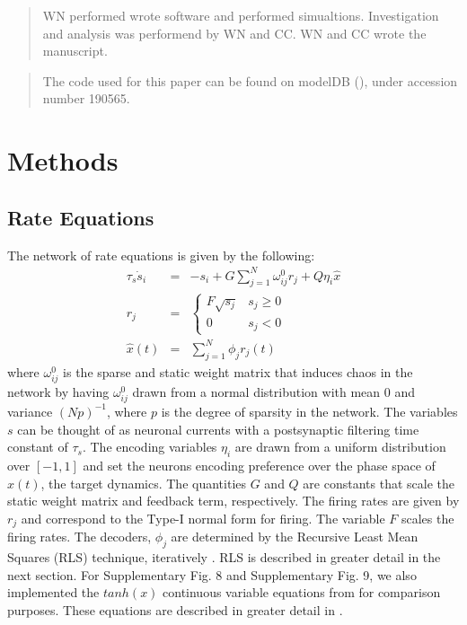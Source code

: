 \documentclass[11pt]{article} %
\begin{document}
\renewcommand{\abstractname}{Author Contributions}
\begin{abstract}
WN performed wrote software and performed simualtions.  Investigation and analysis was performend by WN and CC.  WN and CC wrote the manuscript.   
\end{abstract}


\renewcommand{\abstractname}{Data Availability Statement}
\begin{abstract}
The code used for this paper can be found on modelDB (\cite{modeldb}), under accession number 190565.
\end{abstract}

\section*{Methods} 
\subsection*{Rate Equations} 

The network of rate equations is given by the following:
\begin{eqnarray}
\tau_s\dot{s}_i &=& -s_i + G\sum_{j=1}^N \omega^0_{ij} r_j + Q\eta_i \hat{x}\\
r_j &=& \begin{cases} F \sqrt{s_j} & s_j\geq 0 \\ 0 & s_j <0   \end{cases} \\
\hat{x}(t) &=& \sum_{j=1}^N \phi_j r_j(t) 
\end{eqnarray} 
where $\omega^0_{ij} $ is the sparse and static weight matrix that induces chaos in the network by having $\omega^0_{ij}$ drawn from a normal distribution with mean 0 and variance $(Np)^{-1}$, where $p$ is the degree of sparsity in the network.  The variables $s$ can be thought of as neuronal currents with a postsynaptic filtering time constant of $\tau_s$.   The encoding variables $\eta_i$ are drawn from a uniform distribution over $[-1,1]$ and set the neurons encoding preference over the phase space of $x(t)$, the target dynamics.  The quantities $G$ and $Q$ are constants that scale the static weight matrix and feedback term, respectively.   The firing rates are given by $r_j$ and correspond to the Type-I normal form for firing.  The variable $F$ scales the firing rates.    The decoders, $\phi_j$ are determined by the Recursive Least Mean Squares (RLS) technique, iteratively \cite{haykin,bishop}.  RLS is described in greater detail in the next section.  For Supplementary Fig. 8 and Supplementary Fig. 9, we also implemented the $tanh(x)$ continuous variable equations from \cite{FORCE1} for comparison purposes.  These equations are described in greater detail in \cite{FORCE1}.  
 
\end{document}

